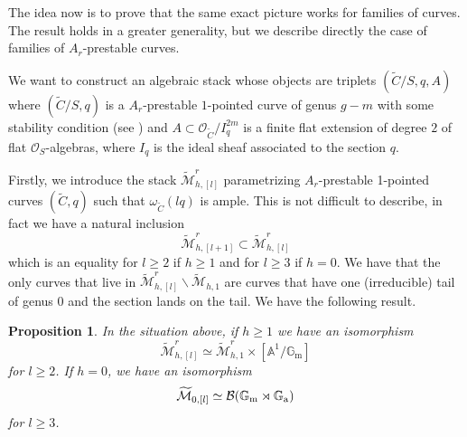 \documentclass{alggeom}
\numberwithin{equation}{section}
\numberwithin{subsection}{section}
\newtheorem{proposition}[theorem]{Proposition}
\theoremstyle{definition}
\theoremstyle{remark}
\newcommand\cO{\mathcal{O}} \newcommand\cP{\mathcal{P}}
\renewcommand\AA{\mathbb{A}} \newcommand\BB{\mathbb{B}}
\newcommand\GG{\mathbb{G}} \newcommand\HH{\mathbb{H}}
\newcommand\rma{\mathrm{a}} \newcommand\rmb{\mathrm{b}}
\newcommand\rmm{\mathrm{m}} \newcommand\rmn{\mathrm{n}}
\renewcommand{\setminus}{\smallsetminus}
\newcommand{\gm}{\GG_{\rmm}}
\newcommand{\ga}{\GG_{\rma}}
\newcommand{\Mtilde}{\widetilde{\mathcal M}}
\begin{document}
The idea now is to prove that the same exact picture works for families of curves. The result holds in a greater generality, but we describe directly the case of families of $A_r$-prestable curves. 

We want to construct an algebraic stack whose objects are triplets $(\widetilde{C}/S,q,A)$ where $(\widetilde{C}/S,q)$ is a $A_r$-prestable $1$-pointed curve of genus $g-m$ with some stability condition (see ) and $A\subset \cO_{\widetilde{C}}/I_q^{2m}$ is a finite flat extension  of degree $2$ of flat $\cO_S$-algebras, where $I_q$ is the ideal sheaf associated to the section $q$. 

Firstly, we introduce the stack $\Mtilde_{h,[l]}^r$ parametrizing $A_r$-prestable 1-pointed curves $(\widetilde{C},q)$ such that $\omega_{\widetilde{C}}(lq)$ is ample. This is not difficult to describe, in fact we have a natural inclusion
$$ \Mtilde_{h,[l+1]}^r\subset \Mtilde_{h,[l]}^r$$ 
which is an equality for $l\geq 2$ if $h\geq 1$ and for $l\geq 3$ if $h=0$. We have that the only curves that live in $\Mtilde_{h,[l]}^r\setminus \Mtilde_{h,1}$ are curves that have one (irreducible) tail of genus $0$ and the section lands on the tail. We have the following result.

\begin{proposition}\label{prop:desc-str}
	In the situation above, if $h\geq 1$ we have an isomorphism 
	$$ \Mtilde_{h,[l]}^r \simeq \Mtilde_{h,1}^r\times [\AA^1/\gm]$$ 
	for $l\geq 2$. If $h=0$, we have an isomorphism 
	$$ \Mtilde_{0,[l]}\simeq \cB(\gm \rtimes \ga)$$ 
	for $l\geq 3$.
\end{proposition} 
\end{document}
